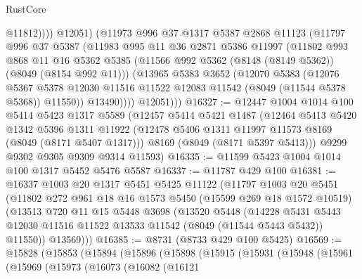 \begin{lexlean}{RustCore}
\begin{coremodule}
                  @11812))))
          @12051)
        (@11973
          @996
          @37
          @1317
          @5387
          @2868
          @11123
          (@11797
            @996
            @37
            @5387
            (@11983
              @995
              @11
              @36
              @2871
              @5386
              @11997
              (@11802
                @993
                @868
                @11
                @16
                @5362
                @5385
                (@11566 @992 @5362 (@8148 (@8149 @5362)) (@8049 (@8154 @992 @11)))
                (@13965
                  @5383
                  @3652
                  (@12070
                    @5383
                    (@12076
                      @5367
                      @5378
                      @12030
                      @11516
                      @11522
                      @12083
                      @11542
                      (@8049 (@11544 @5378 @5368))
                      @11550))
                  @13490))))
          @12051)))
@16327 := @12447
    @1004
    @1014
    @100
    @5414
    @5423
    @1317
    @5589
    (@12457
      @5414
      @5421
      @1487
      (@12464
        @5413
        @5420
        @1342
        @5396
        @1311
        @11922
        (@12478 @5406 @1311 @11997 @11573 @8169 (@8049 (@8171 @5407 @1317)))
        @8169
        (@8049 (@8171 @5397 @5413)))
      @9299
      @9302
      @9305
      @9309
      @9314
      @11593)
@16335 := @11599 @5423 @1004 @1014 @100 @1317 @5452 @5476 @5587
@16337 := @11787 @429 @100
@16381 := @16337
    @1003
    @20
    @1317
    @5451
    @5425
    @11122
    (@11797
      @1003
      @20
      @5451
      (@11802
        @272
        @961
        @18
        @16
        @1573
        @5450
        (@15599 @269 @18 @1572 @10519)
        (@13513
          @720
          @11
          @15
          @5448
          @3698
          (@13520
            @5448
            (@14228
              @5431
              @5443
              @12030
              @11516
              @11522
              @13533
              @11542
              (@8049 (@11544 @5443 @5432))
              @11550))
          @13569)))
@16385 := @8731 (@8733 @429 @100 @5425)
@16569 := @15828
    (@15853
      (@15894
        (@15896
          (@15898
            (@15915
              (@15931
                (@15948
                  (@15961
                    (@15969
                      (@15973
                        (@16073
                          (@16082
                            (@16121

\end{coremodule}
\end{lexlean}
